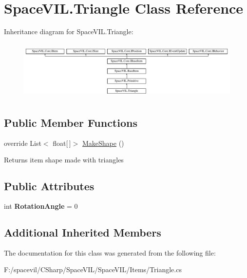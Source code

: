 \hypertarget{class_space_v_i_l_1_1_triangle}{}\section{Space\+V\+I\+L.\+Triangle Class Reference}
\label{class_space_v_i_l_1_1_triangle}
Inheritance diagram for Space\+V\+I\+L.\+Triangle\+:\begin{figure}[H]
\begin{center}
\leavevmode
\includegraphics[height=3.027027cm]{class_space_v_i_l_1_1_triangle}
\end{center}
\end{figure}
\subsection*{Public Member Functions}
\begin{DoxyCompactItemize}
\item 
\mbox{\label{class_space_v_i_l_1_1_triangle_a454090bb2cb1e8635643fce5ecfd7e7c}} 
override List$<$ float\mbox{[}$\,$\mbox{]}$>$ \mbox{\hyperlink{class_space_v_i_l_1_1_triangle_a454090bb2cb1e8635643fce5ecfd7e7c}{Make\+Shape}} ()
\begin{DoxyCompactList}\small\item\em \begin{DoxyReturn}{Returns}
item shape made with triangles 
\end{DoxyReturn}
\end{DoxyCompactList}\end{DoxyCompactItemize}
\subsection*{Public Attributes}
\begin{DoxyCompactItemize}
\item 
\mbox{\label{class_space_v_i_l_1_1_triangle_a8c1e0b5f117270be3c982cdd7753a911}} 
int {\bfseries Rotation\+Angle} = 0
\end{DoxyCompactItemize}
\subsection*{Additional Inherited Members}


The documentation for this class was generated from the following file\+:\begin{DoxyCompactItemize}
\item 
F\+:/spacevil/\+C\+Sharp/\+Space\+V\+I\+L/\+Space\+V\+I\+L/\+Items/Triangle.\+cs\end{DoxyCompactItemize}
